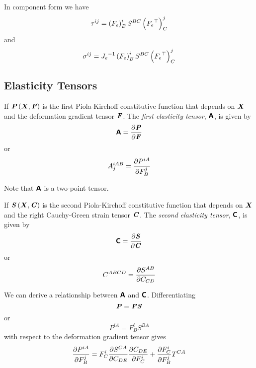 In component form we have
\begin{equation}
  \tau^{ij}=\left( F_{e} \right)^{i}_{B}S^{BC}\left(  {F_{e}}^{ \top }  \right)^{j}_{C}
\end{equation}
and
\begin{equation}
  \sigma^{ij}={J_{e}}^{-1}\left( F_{e} \right)^{i}_{B}S^{BC}\left(  {F_{e}}^{ \top }  \right)^{j}_{C}
\end{equation}

\subsection{Elasticity Tensors}

If $ \boldsymbol{\mathit{P}}\left(  \boldsymbol{X} ,\boldsymbol{\mathit{F}} \right) $ is the first Piola-Kirchoff
constitutive function that depends on $ \boldsymbol{X} $ and the deformation
gradient tensor $\boldsymbol{\mathit{F}}$. The \emph{first elasticity tensor},
$\boldsymbol{\mathsf{A}}$, is given by 
\begin{equation}
  \boldsymbol{\mathsf{A}}= \dfrac{\partial \boldsymbol{\mathit{P}}}{\partial \boldsymbol{\mathit{F}}} 
\end{equation}
or
\begin{equation}
  A^{iAB}_{j}= \dfrac{\partial P^{iA}}{\partial F^{j}_{B}} 
\end{equation}

Note that $\boldsymbol{\mathsf{A}}$ is a two-point tensor. 

If $ \boldsymbol{\mathit{S}}\left(  \boldsymbol{X} ,\boldsymbol{\mathit{C}} \right) $ is the second Piola-Kirchoff
constitutive function that depends on $ \boldsymbol{X} $ and the right Cauchy-Green
strain tensor $\boldsymbol{\mathit{C}}$. The \emph{second elasticity tensor},
$\boldsymbol{\mathsf{C}}$, is given by 
\begin{equation}
  \boldsymbol{\mathsf{C}}= \dfrac{\partial \boldsymbol{\mathit{S}}}{\partial \boldsymbol{\mathit{C}}} 
\end{equation}
or
\begin{equation}
  C^{ABCD}= \dfrac{\partial S^{AB}}{\partial C_{CD}} 
\end{equation}

We can derive a relationship between $\boldsymbol{\mathsf{A}}$ and $\boldsymbol{\mathsf{C}}$. Differentiating
\begin{equation}
  \boldsymbol{\mathit{P}}=\boldsymbol{\mathit{F}}\boldsymbol{\mathit{S}}
\end{equation}
or
\begin{equation}
  P^{iA}=F^{i}_{B}S^{BA}
\end{equation}
with respect to the deformation gradient tensor gives
\begin{equation}
   \dfrac{\partial P^{iA}}{\partial F^{j}_{B}} =F^{i}_{C} \dfrac{\partial S^{CA}}{\partial C_{DE}}  \dfrac{\partial C_{DE}}{\partial F^{i}_{C}} + \dfrac{\partial F^{i}_{C}}{\partial F^{j}_{B}} T^{CA}
\end{equation}

